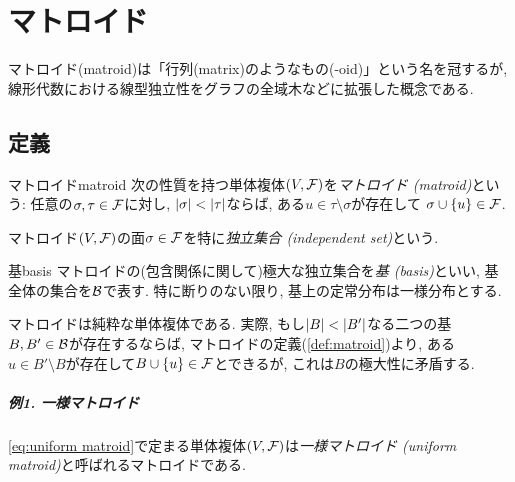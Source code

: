\chapter{マトロイド} \label{chap:matroid}
マトロイド(matroid)は「行列(matrix)のようなもの(-oid)」という名を冠するが,
線形代数における線型独立性をグラフの全域木などに拡張した概念である.

\section{定義}
\begin{definition}{マトロイド}{matroid}
    次の性質を持つ単体複体$(V,\mathcal{F})$を\emph{マトロイド (matroid)}という:
    任意の$\sigma,\tau \in \mathcal{F}$に対し, $\lvert\sigma\rvert < \lvert\tau\rvert$ならば,
    ある$ u \in \tau \setminus \sigma$が存在して
    $\sigma \cup \lbrace u\rbrace \in \mathcal{F}$.

    マトロイド$(V,\mathcal{F})$の面$\sigma\in \mathcal{F}$を特に\emph{独立集合 (independent set)}という.
\end{definition}

\begin{definition}{基}{basis}
    マトロイドの(包含関係に関して)極大な独立集合を\emph{基 (basis)}といい, 基全体の集合を$\mathcal{B}$で表す.
    特に断りのない限り, 基上の定常分布は一様分布とする.
\end{definition}
マトロイドは純粋な単体複体である.
実際, もし$\lvert B\rvert < \lvert B'\rvert$なる二つの基$B,B'\in\mathcal{B}$が存在するならば,
マトロイドの定義(\cref{def:matroid})より,
ある$u \in B'\setminus B$が存在して$B\cup \{u\} \in \mathcal{F}$とできるが,
これは$B$の極大性に矛盾する.

\paragraph*{例1. 一様マトロイド}
\cref{eq:uniform matroid}で定まる単体複体$(V,\mathcal{F})$は\emph{一様マトロイド (uniform matroid)}と呼ばれるマトロイドである.

